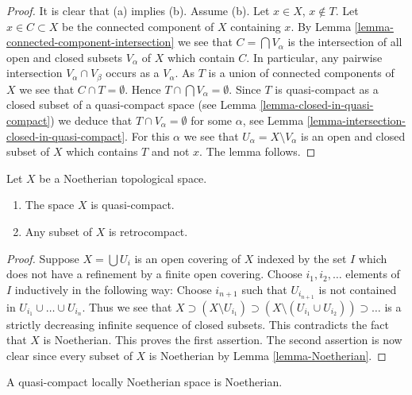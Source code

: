\begin{proof}
It is clear that (a) implies (b).
Assume (b). Let $x \in X$, $x \not \in T$. Let $x \in C \subset X$
be the connected component of $X$ containing $x$. By
Lemma \ref{lemma-connected-component-intersection}
we see that $C = \bigcap V_\alpha$ is the intersection of all open and
closed subsets $V_\alpha$ of $X$ which contain $C$.
In particular, any pairwise intersection $V_\alpha \cap V_\beta$
occurs as a $V_\alpha$.
As $T$ is a union of connected components
of $X$ we see that $C \cap T = \emptyset$. Hence
$T \cap \bigcap V_\alpha = \emptyset$. Since $T$ is quasi-compact as a
closed subset of a quasi-compact space (see
Lemma \ref{lemma-closed-in-quasi-compact})
we deduce that $T \cap V_\alpha = \emptyset$ for some $\alpha$, see
Lemma \ref{lemma-intersection-closed-in-quasi-compact}.
For this $\alpha$ we see that $U_\alpha = X \setminus V_\alpha$
is an open and closed subset of $X$ which contains $T$ and not $x$.
The lemma follows.
\end{proof}

\begin{lemma}
\label{lemma-Noetherian-quasi-compact}
Let $X$ be a Noetherian topological space.
\begin{enumerate}
\item The space $X$ is quasi-compact.
\item Any subset of $X$ is retrocompact.
\end{enumerate}
\end{lemma}

\begin{proof}
Suppose $X = \bigcup U_i$ is an open covering of $X$ indexed
by the set $I$ which does not have a refinement by a finite
open covering. Choose $i_1, i_2, \ldots $ elements of $I$ inductively
in the following way: Choose $i_{n + 1}$ such that $U_{i_{n + 1}}$
is not contained in $U_{i_1} \cup \ldots \cup U_{i_n}$. Thus we see that
$X \supset (X \setminus U_{i_1}) \supset
(X \setminus (U_{i_1} \cup U_{i_2})) \supset \ldots$ is a strictly
decreasing infinite sequence of closed subsets. This contradicts
the fact that $X$ is Noetherian. This proves the first assertion.
The second assertion is now clear since every subset of $X$ is Noetherian by
Lemma \ref{lemma-Noetherian}.
\end{proof}

\begin{lemma}
\label{lemma-quasi-compact-locally-Noetherian-Noetherian}
A quasi-compact locally Noetherian space is Noetherian.
\end{lemma}

